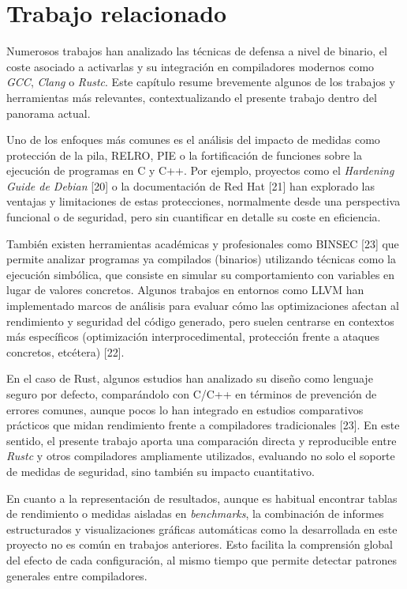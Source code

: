 \chapter{Trabajo relacionado}
\label{chap:trabajo}

Numerosos trabajos han analizado las técnicas de defensa a nivel de binario, el coste asociado a activarlas y su integración en compiladores modernos como \emph{GCC}, \emph{Clang} o \emph{Rustc}. Este capítulo resume brevemente algunos de los trabajos y herramientas más relevantes, contextualizando el presente trabajo dentro del panorama actual.

Uno de los enfoques más comunes es el análisis del impacto de medidas como protección de la pila, RELRO, PIE o la fortificación de funciones sobre la ejecución de programas en C y C++. Por ejemplo, proyectos como el \emph{Hardening Guide de Debian} [20] o la documentación de Red Hat [21] han explorado las ventajas y limitaciones de estas protecciones, normalmente desde una perspectiva funcional o de seguridad, pero sin cuantificar en detalle su coste en eficiencia.

También existen herramientas académicas y profesionales como BINSEC [23] que permite analizar programas ya compilados (binarios) utilizando técnicas como la ejecución simbólica, que consiste en simular su comportamiento con variables en lugar de valores concretos. Algunos trabajos en entornos como LLVM han implementado marcos de análisis para evaluar cómo las optimizaciones afectan al rendimiento y seguridad del código generado, pero suelen centrarse en contextos más específicos (optimización interprocedimental, protección frente a ataques concretos, etcétera) [22].

En el caso de Rust, algunos estudios han analizado su diseño como lenguaje seguro por defecto, comparándolo con C/C++ en términos de prevención de errores comunes, aunque pocos lo han integrado en estudios comparativos prácticos que midan rendimiento frente a compiladores tradicionales [23]. En este sentido, el presente trabajo aporta una comparación directa y reproducible entre \emph{Rustc} y otros compiladores ampliamente utilizados, evaluando no solo el soporte de medidas de seguridad, sino también su impacto cuantitativo.

En cuanto a la representación de resultados, aunque es habitual encontrar tablas de rendimiento o medidas aisladas en \emph{benchmarks}, la combinación de informes estructurados y visualizaciones gráficas automáticas como la desarrollada en este proyecto no es común en trabajos anteriores. Esto facilita la comprensión global del efecto de cada configuración, al mismo tiempo que permite detectar patrones generales entre compiladores.
